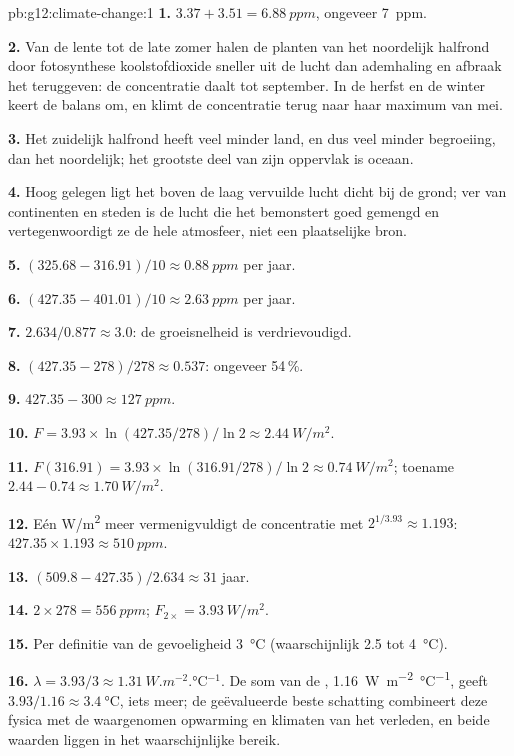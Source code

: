 \begin{solution}{pb:g12:climate-change:1}
\textbf{1.} $3.37 + 3.51 = \qty{6.88}{ppm}$, ongeveer \qty{7}{ppm}.

\textbf{2.} Van de lente tot de late zomer halen de planten van het noordelijk
halfrond door fotosynthese koolstofdioxide sneller uit de lucht dan
ademhaling en afbraak het teruggeven: de concentratie daalt tot september.
In de herfst en de winter keert de balans om, en klimt de concentratie
terug naar haar maximum van mei.

\textbf{3.} Het zuidelijk halfrond heeft veel minder land, en dus veel minder
begroeiing, dan het noordelijk; het grootste deel van zijn oppervlak is oceaan.

\textbf{4.} Hoog gelegen ligt het boven de laag vervuilde lucht dicht bij de
grond; ver van continenten en steden is de lucht die het bemonstert goed gemengd en
vertegenwoordigt ze de hele atmosfeer, niet een plaatselijke bron.

\textbf{5.} $(325.68 - 316.91)/10 \approx \qty{0.88}{ppm}$ per jaar.

\textbf{6.} $(427.35 - 401.01)/10 \approx \qty{2.63}{ppm}$ per jaar.

\textbf{7.} $2.634/0.877 \approx 3.0$: de groeisnelheid is verdrievoudigd.

\textbf{8.} $(427.35 - 278)/278 \approx 0.537$: ongeveer 54\,\%.

\textbf{9.} $427.35 - 300 \approx \qty{127}{ppm}$.

\textbf{10.} $F = 3.93 \times \ln(427.35/278)/\ln 2 \approx
\qty{2.44}{W/m^2}$.

\textbf{11.} $F(316.91) = 3.93 \times \ln(316.91/278)/\ln 2 \approx
\qty{0.74}{W/m^2}$; toename $2.44 - 0.74 \approx \qty{1.70}{W/m^2}$.

\textbf{12.} Eén \unit{W/m^2} meer vermenigvuldigt de concentratie met
$2^{1/3.93} \approx 1.193$: $427.35 \times 1.193 \approx \qty{510}{ppm}$.

\textbf{13.} $(509.8 - 427.35)/2.634 \approx 31$ jaar.

\textbf{14.} $2 \times 278 = \qty{556}{ppm}$;  $F_{2\times} =
\qty{3.93}{W/m^2}$.

\textbf{15.} Per definitie van de gevoeligheid \qty{3}{\degreeCelsius}
(waarschijnlijk 2.5 tot \qty{4}{\degreeCelsius}).

\textbf{16.} $\lambda = 3.93/3 \approx \qty{1.31}{W.m^{-2}.\degreeCelsius^{-1}}$.
De som van de , \qty{1.16}{W.m^{-2}.\degreeCelsius^{-1}}, geeft
$3.93/1.16 \approx \qty{3.4}{\degreeCelsius}$, iets meer; de geëvalueerde
beste schatting combineert deze fysica met de waargenomen opwarming en klimaten van het
verleden, en beide waarden liggen in het waarschijnlijke bereik.


\end{solution}
